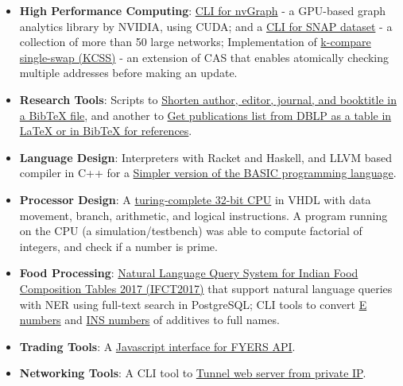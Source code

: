 \begin{itemize}[noitemsep, leftmargin=*]
  \item \textbf{High Performance Computing}:
    \href{https://github.com/nodef/nvgraph.sh}{CLI for nvGraph} - a GPU-based graph analytics library by NVIDIA, using CUDA; and a \href{https://github.com/nodef/snap-data.sh}{CLI for SNAP dataset} - a collection of more than 50 large networks; Implementation of \href{https://github.com/javaf/k-compare-single-swap}{k-compare single-swap (KCSS)} - an extension of CAS that enables atomically checking multiple addresses before making an update.
  \item \textbf{Research Tools}:
    Scripts to \href{https://github.com/javascriptf/script-minify-bibtex}{Shorten author, editor, journal, and booktitle in a BibTeX file},
    and another to \href{https://github.com/javascriptf/script-publications-list}{Get publications list from DBLP as a table in LaTeX or in BibTeX for references}.
  \item \textbf{Language Design}:
    Interpreters with Racket and Haskell, and
    LLVM based compiler in C++ for a \href{https://github.com/compilerz/basic}{Simpler version of the BASIC programming language}.
  \item \textbf{Processor Design}:
    A \href{https://github.com/vhdlf/cpu_basic}{turing-complete 32-bit CPU} in VHDL with data movement, branch, arithmetic, and logical instructions. A program running on the CPU (a simulation/testbench) was able to compute factorial of integers, and check if a number is prime.
  \item \textbf{Food Processing}:
    \href{https://ifct2017.github.io}{Natural Language Query System for Indian Food Composition Tables 2017 (IFCT2017)} that support natural language queries with NER using full-text search in PostgreSQL;
    CLI tools to convert \href{https://github.com/nodef/food-e}{E numbers} and \href{https://github.com/nodef/food-ins}{INS numbers} of additives to full names.
  \item \textbf{Trading Tools}:
    A \href{https://github.com/nodef/extra-fyers}{Javascript interface for FYERS API}.
  \item \textbf{Networking Tools}:
    A CLI tool to \href{https://github.com/nodef/extra-tunnel}{Tunnel web server from private IP}.

\end{itemize}
